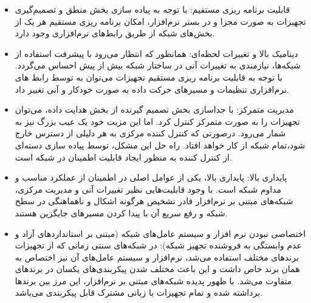 \begin{itemize}
	\item
قابلیت برنامه ریزی مستفیم: با توجه به پیاده سازی بخش منطق و تصمیم‌گیری تجهیزات به صورت مجزا و در بستر نرم‌افزار، امکان برنامه ریزی مستقیم هر یک از بخش‌های شبکه از طریق رابط‌های نرم‌افزاری وجود دارد.
	\item 
دینامیک بالا و تغییرات لحظه‌ای: همانظور که انتظار می‌رود با پیشرفت استفاده از شبکه‌ها، نیازمندی به تغییرات آنی در ساختار شبکه بیش از پیش احساس می‌گردد. با توجه به قابلیت برنامه ریزی مستقیم تجهیزات می‌توان به توسط رابط های نرم‌افزاری تنظیمات و مسیر‌های حرکت داده به صورت خودکار و آنی تغییر داد.
	\item 
مدیریت متمرکز: با جداسازی بخش تصمیم گیرنده از بخش هدایت داده، می‌توان تجهیزات را به صورت متمرکز کنترل کرد. اما این مزیت خود یک عیب بزرگ نیز به شمار می‌رود. درصورتی که کنترل کننده مرکزی به هر دلیلی از دسترس خارج شود،‌تمام شبکه از کار خواهد افتاد. راه حل این مشکل، توسط پیاده سازی دسته‌ای از کنترل کننده به منظور ایجاد قابلیت اطمینان در شبکه است.
	\item
پایداری بالا: پایداری بالا، یکی از عوامل اصلی در اطمینان از عملکرد مناسب و مداوم شبکه است. با وجود قابلیت‌هایی نظیر تغییرات آنی و مدیریت مرکزی، شبکه‌های مبتنی بر نرم‌افزار قادر تشخیص هرگونه اشکال و ناهماهنگی در سطح شبکه و رفع سریع آن با پیدا کردن مسیر‌های جایگزین هستند.
	\item 
اختصاصی نبودن نرم افزار و سیستم عامل‌های شبکه (مبتنی بر استاندارد‌های آزاد و عدم وابستگی به فروشنده تجهیز شبکه): در شبکه‌های سنتی زمانی که از تجهیزات برند‌های مختلف استفاده می‌شد، نرم‌افزار و سیستم عامل‌های آن نیز اختصاص به همان برند خاص داشت و این باعث مختلف شدن پیکربندی‌های یکسان در برند‌های متفاوت می‌شد. با ظهور پدیده شبکه‌های مبتنی بر نرم‌افزار، این مرز بین برند‌ها برداشته شده و تمام تجهیزات با زبانی مشترک قابل پیکربندی می‌باشد.
\end{itemize}

